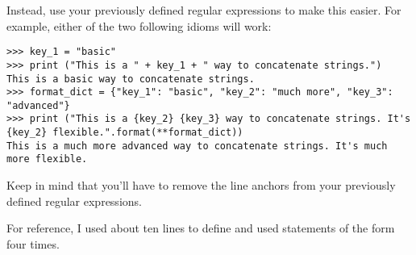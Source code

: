 \begin{problem*}
\begin{warn}
Instead, use your previously defined regular expressions to make this easier. For example, either of the two following idioms will work:
\begin{lstlisting}
>>> key_1 = "basic"
>>> print ("This is a " + key_1 + " way to concatenate strings.")
This is a basic way to concatenate strings.
>>> format_dict = {"key_1": "basic", "key_2": "much more", "key_3": "advanced"}
>>> print ("This is a {key_2} {key_3} way to concatenate strings. It's {key_2} flexible.".format(**format_dict))
This is a much more advanced way to concatenate strings. It's much more flexible.
\end{lstlisting}
Keep in mind that you'll have to remove the line anchors from your previously defined regular expressions.

For reference, I used about ten lines to define  and used statements of the form  four times.
\end{warn}

\label{prob:match_function_definition}
\end{problem*}
